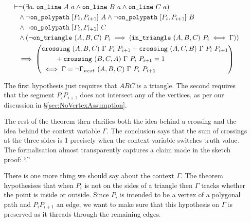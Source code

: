 \begin{multline*}
  \begin{aligned}
    \vdash&\Triangle{a}{A}{B}{C}\\
    &\wedge \neg\code{on\_polypath}\ [P_i,P_{i+1}]\ A\wedge \neg\code{on\_polypath}\ [P_i,P_{i+1}]\ B\\&\wedge \neg\code{on\_polypath}\ [P_i,P_{i+1}]\ C\\
    &\wedge(\neg\code{on\_triangle}\ (A,B,C)\ P_i \implies (\code{in\_triangle}\ (A,B,C)\ P_i \iff \Gamma))\\
  \end{aligned}\\
    \implies\left(\begin{aligned}[]
        &\code{crossing}\ (A,B,C)\ \Gamma\ P_i\ P_{i+1} + \code{crossing}\ (A,C,B)\ \Gamma\ P_i\ P_{i+1}\\
          &\qquad+ \code{crossing}\ (B,C,A)\ \Gamma\ P_i\ P_{i+1} = 1 \\
          &\iff \Gamma = \neg \Gamma_{next}\ (A,B,C)\ \Gamma\ P_i\ P_{i+1}
        \end{aligned}\right)
\end{multline*}

The first hypothesis just requires that $ABC$ is a triangle. The second requires that the segment $P_iP_{i+1}$ does not intersect any of the vertices, as per our discussion in \S\ref{sec:NoVertexAssumption}. 

The rest of the theorem then clarifies both the idea behind a crossing and the idea behind the context variable $\Gamma$. The conclusion says that the sum of crossings at the three sides is 1 precisely when the context variable switches truth value. The formalisation almost transparently captures a claim made in the sketch proof: ``\insideoutsideclaim.''

There is one more thing we should say about the context $\Gamma$. The theorem hypothesises that when $P_i$ is not on the sides of a triangle then $\Gamma$ tracks whether the point is inside or outside. Since $P_i$ is intended to be a vertex of a polygonal path and $P_iP_{i+1}$ an edge, we want to make sure that this hypothesis on $\Gamma$ is preserved as it threads through the remaining edges. 

